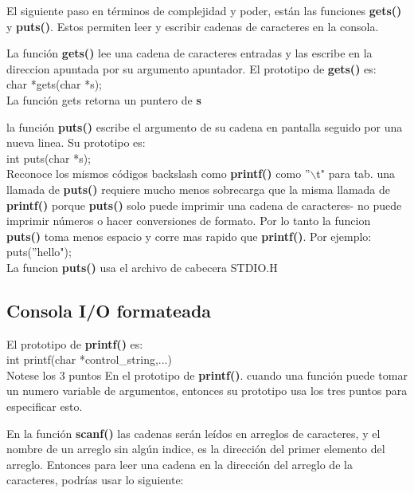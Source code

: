\documentclass[]{article}
\begin{document}
	El siguiente paso en términos de complejidad y poder, están las funciones \textbf{gets()} y \textbf{puts()}. Estos permiten leer y escribir cadenas de caracteres en la consola.
	
	La función \textbf{gets()} lee una cadena de caracteres entradas y las escribe en la direccion apuntada por su argumento apuntador. El prototipo de \textbf{gets()} es:\\
	
	char *gets(char *s);\\
	
	La función gets retorna un puntero de \textbf{s}
	
	la función \textbf{puts()} escribe el argumento de su cadena en pantalla seguido por  una nueva linea. Su prototipo es:\\
	
	int puts(char *s);\\
	
	Reconoce los mismos códigos backslash como \textbf{printf()} como ''$\backslash$t" para tab. una llamada de \textbf{puts()} requiere mucho menos sobrecarga que la misma llamada de \textbf{printf()} porque \textbf{puts()} solo puede imprimir una cadena de caracteres- no puede imprimir números o hacer conversiones de formato. Por lo tanto la funcion \textbf{puts()} toma menos espacio y corre mas rapido que \textbf{printf()}. Por ejemplo:\\
	
	puts(''hello");\\
	
	La funcion \textbf{puts()} usa el archivo de cabecera STDIO.H
	
	\subsection{Consola I/O formateada}
	
	El prototipo de \textbf{printf()} es:\\
	
	int printf(char *control\_string,...)\\
	
	Notese los 3 puntos En el prototipo de \textbf{printf()}. cuando una función puede tomar un numero variable de argumentos, entonces su prototipo usa los tres puntos para especificar esto.
	
	En la función \textbf{scanf()} las cadenas serán leídos en arreglos de caracteres, y el nombre de un arreglo sin algún indice, es la dirección del primer elemento del arreglo. Entonces para leer una cadena en la dirección del arreglo de la caracteres, podrías usar lo siguiente:\\
	
\end{document}
